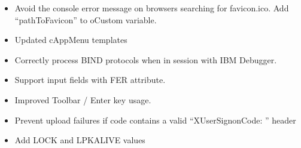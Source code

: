 \documentclass[letterpaper,10pt,english]{sphinxmanual}
\begin{document}
\sphinxAtStartPar
{}
\begin{itemize}
\item {} 
\sphinxAtStartPar
Avoid the console error message on browsers searching for favicon.ico. Add “pathToFavicon” to oCustom variable.

\end{itemize}

\sphinxAtStartPar
{}
\begin{itemize}
\item {} 
\sphinxAtStartPar
Updated cAppMenu templates

\end{itemize}

\sphinxAtStartPar
{}
\begin{itemize}
\item {} 
\sphinxAtStartPar
Correctly process BIND protocols when in session with IBM Debugger.

\end{itemize}

\sphinxAtStartPar
{}
\begin{itemize}
\item {} 
\sphinxAtStartPar
Support input fields with FER attribute.

\end{itemize}

\sphinxAtStartPar
{}
\begin{itemize}
\item {} 
\sphinxAtStartPar
Improved Toolbar / Enter key usage.

\end{itemize}

\sphinxAtStartPar
{}
\begin{itemize}
\item {} 
\sphinxAtStartPar
Prevent upload failures if code contains a valid  “X\sphinxhyphen{}UserSignonCode: ” header

\end{itemize}

\sphinxAtStartPar
{}
\begin{itemize}
\item {} 
\sphinxAtStartPar
Add LOCK and LPKALIVE values

\end{itemize}
\end{document}

